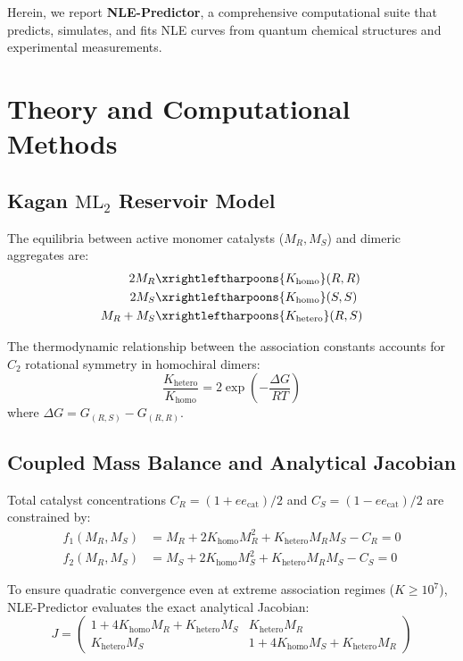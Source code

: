 \documentclass[journal=jacsat,manuscript=article]{achemso}
\begin{document}
Herein, we report \textbf{NLE-Predictor}, a comprehensive computational suite that predicts, simulates, and fits NLE curves from quantum chemical structures and experimental measurements.

\section{Theory and Computational Methods}

\subsection{Kagan $\text{ML}_2$ Reservoir Model}
The equilibria between active monomer catalysts ($M_R, M_S$) and dimeric aggregates are:
\begin{align}
2 M_R &\xrightleftharpoons{K_{\text{homo}}} (R,R) \\
2 M_S &\xrightleftharpoons{K_{\text{homo}}} (S,S) \\
M_R + M_S &\xrightleftharpoons{K_{\text{hetero}}} (R,S)
\end{align}

The thermodynamic relationship between the association constants accounts for $C_2$ rotational symmetry in homochiral dimers:
\begin{equation}
\frac{K_{\text{hetero}}}{K_{\text{homo}}} = 2 \exp\left(-\frac{\Delta G}{RT}\right)
\end{equation}
where $\Delta G = G_{(R,S)} - G_{(R,R)}$.

\subsection{Coupled Mass Balance and Analytical Jacobian}
Total catalyst concentrations $C_R = (1 + ee_{\text{cat}})/2$ and $C_S = (1 - ee_{\text{cat}})/2$ are constrained by:
\begin{align}
f_1(M_R, M_S) &= M_R + 2 K_{\text{homo}} M_R^2 + K_{\text{hetero}} M_R M_S - C_R = 0 \\
f_2(M_R, M_S) &= M_S + 2 K_{\text{homo}} M_S^2 + K_{\text{hetero}} M_R M_S - C_S = 0
\end{align}

To ensure quadratic convergence even at extreme association regimes ($K \ge 10^7$), NLE-Predictor evaluates the exact analytical Jacobian:
\begin{equation}
J = \begin{pmatrix}
1 + 4 K_{\text{homo}} M_R + K_{\text{hetero}} M_S & K_{\text{hetero}} M_R \\
K_{\text{hetero}} M_S & 1 + 4 K_{\text{homo}} M_S + K_{\text{hetero}} M_R
\end{pmatrix}
\end{equation}
\end{document}
